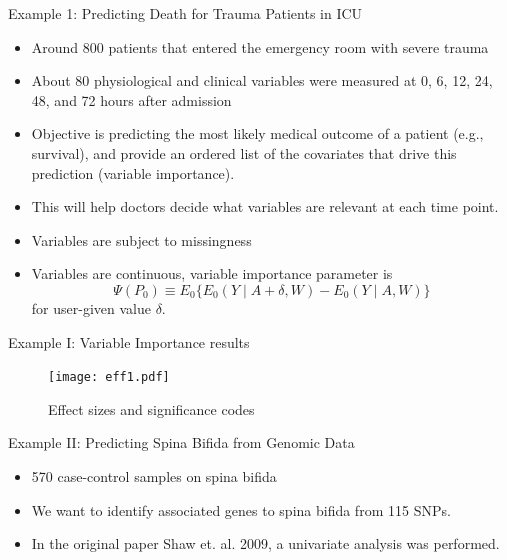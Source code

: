\documentclass[t]{beamer}
\begin{document}
\begin{frame}{Example 1: Predicting Death for Trauma Patients in ICU}
\begin{itemize}
\item Around 800 patients that entered the emergency room with severe
  trauma
\item About 80 physiological and clinical variables were measured at 0,
  6, 12, 24, 48, and 72 hours after admission
\item Objective is predicting the most likely medical outcome of a
  patient (e.g., survival), and provide an ordered list of the covariates that drive  this prediction (variable importance).
\item This will help doctors decide what variables are relevant at
  each time point.
\item Variables are subject to missingness
\item Variables are continuous, variable importance parameter is
\[\Psi(P_0)\equiv E_0\{E_0(Y\mid A+\delta,W)-E_0(Y\mid A,W)\}\]
for user-given value $\delta$.
\end{itemize}
\end{frame}

\begin{frame}{Example I: Variable Importance results}
\begin{figure}[H]
\texttt{[image: eff1.pdf]}
\caption{Effect sizes and significance codes}
\end{figure}
\end{frame}


\begin{frame}{Example II: Predicting Spina Bifida from Genomic Data}
\begin{itemize}
\item 570 case-control samples on spina bifida
\item We want to identify associated genes to spina bifida from 115 SNPs.
\item In the original paper Shaw et. al. 2009, a univariate analysis was
performed.
\end{itemize}
\end{frame}
\end{document}
